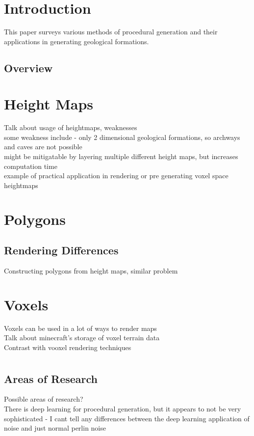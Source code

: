 \documentclass[12pt]{article}
\begin{document}
	\tableofcontents
	\clearpage
	
	\section{Introduction}
		This paper surveys various methods of procedural generation and their applications in generating geological formations. 
		\subsection{Overview}
		
	\section{Height Maps}
		Talk about usage of heightmaps, weaknesses\\
		some weakness include - only 2 dimensional geological formations, so archways and caves are not possible \\
		might be mitigatable by layering multiple different height maps, but increases computation time\\
		example of practical application in rendering or pre generating voxel space heightmaps 
	
	\section{Polygons}
		\subsection{Rendering Differences }
		Constructing polygons from height maps, similar problem
		\subsection{}
	
	\section{Voxels}
		Voxels can be used in a lot of ways to render maps \\
		Talk about minecraft's storage of voxel terrain data \\
		Contrast with vooxel rendering techniques
	\section{}
		\subsection{Areas of Research}
		Possible areas of research? \\
		There is deep learning for procedural generation, but it appears to not be very sophisticated - I cant tell any differences between the deep learning application of noise and just normal perlin noise\\
\end{document}
